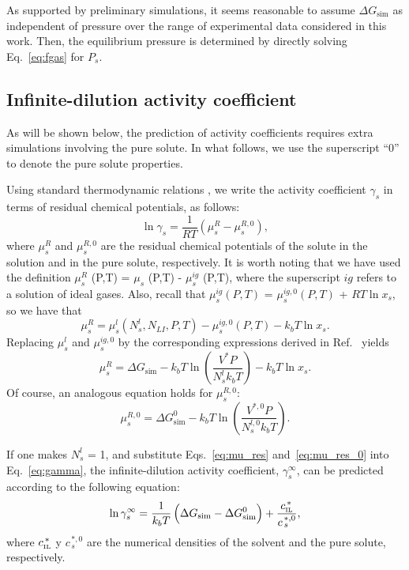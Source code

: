 \documentclass[3p,twocolumn]{elsarticle}
\begin{document}
As supported by preliminary simulations, it seems reasonable to assume $\Delta G_{\text{sim}}$ as independent of pressure over the range of experimental data considered in this work.
Then, the equilibrium pressure is determined by directly solving Eq.~\eqref{eq:fgas} for $P_s$.

\subsection*{Infinite-dilution activity coefficient}

As will be shown below, the prediction of activity coefficients requires extra simulations involving the pure solute.
In what follows, we use the superscript ``$0$'' to denote the pure solute properties.

Using standard thermodynamic relations \cite{Tester}, we write the activity coefficient $\gamma_s$ in terms of residual chemical potentials, as follows:
\begin{equation}
\label{eq:gamma}
\ln \gamma_s = \frac{1}{RT} (\mu_s^R - \mu_s^{R,0}),
\end{equation}
where $\mu_s^R$ and $\mu_s^{R,0}$ are the residual chemical potentials of the solute in the solution and in the pure solute, respectively.
It is worth noting that we have used the definition $\mu_s^{R}$ (P,T) = $\mu_s$ (P,T) - $\mu_s^{ig}$ (P,T), where the superscript $ig$ refers to a solution of ideal gases.
Also, recall that $\mu_s^{ig} (P,T)$ = $\mu_s^{ig,0} (P,T)$ + $RT \ln x_s$, so we have that
\begin{equation}
\mu_s^R = \mu_s^l(N_s^l,N_{LI},P,T) - \mu_s^{ig,0}(P,T) - k_b T \ln x_s.
\end{equation}
Replacing $\mu_s^{l}$ and $\mu_s^{ig,0}$ by the corresponding expressions derived in Ref.~\cite{Shirts_2003} yields
\begin{equation}
\label{eq:mu_res}
\mu_s^R = \Delta G_{\text{sim}} - k_b T \ln \left( \frac{V^{\ast} P}{N_s^l k_b T} \right) -  k_b T \ln x_s.
\end{equation}
Of course, an analogous equation holds for $\mu_s^{R,0}$:
\begin{equation}
\label{eq:mu_res_0}
\mu_s^{R,0} = \Delta G_{\text{sim}}^{0} - k_b T \ln \left( \frac{V^{\ast,0} P}{N_s^{l,0} k_b T} \right).
\end{equation}

If one makes $N_s^{l}$ = 1, and substitute Eqs.~\eqref{eq:mu_res} and~\eqref{eq:mu_res_0} into Eq.~\eqref{eq:gamma}, the infinite-dilution activity coefficient, $\gamma^{\infty}_s$, can be predicted according to the following equation:
\begin{equation}
\label{eq:gamma_inf}
\ln \gamma^{\infty}_s = \frac{1}{k_b T} \left( \Delta G_{\text{sim}} - \Delta G_{\text{sim}}^{0} \right) + \frac{c_\text{\tiny IL}^{\, \ast}}{c_{\, s}^{\, \ast,0}},
\end{equation}
where $c_\text{\tiny IL}^{\, \ast}$ y $c_{\, s}^{\, \ast,0}$ are the numerical densities of the solvent and the pure solute, respectively.
\end{document}
